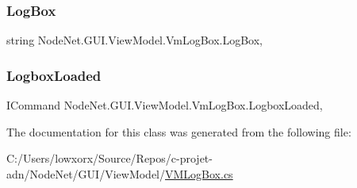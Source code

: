 \subsubsection{\texorpdfstring{Log\+Box}{LogBox}}
{\footnotesize\ttfamily string Node\+Net.\+G\+U\+I.\+View\+Model.\+Vm\+Log\+Box.\+Log\+Box\hspace{0.3cm}{\ttfamily [get]}, {\ttfamily [set]}}

\mbox{\label{class_node_net_1_1_g_u_i_1_1_view_model_1_1_vm_log_box_a0bb3ce310afc07ace0eb55680f5708ef}} 
\subsubsection{\texorpdfstring{Logbox\+Loaded}{LogboxLoaded}}
{\footnotesize\ttfamily I\+Command Node\+Net.\+G\+U\+I.\+View\+Model.\+Vm\+Log\+Box.\+Logbox\+Loaded\hspace{0.3cm}{\ttfamily [get]}, {\ttfamily [set]}}



The documentation for this class was generated from the following file\+:\begin{DoxyCompactItemize}
\item 
C\+:/\+Users/lowxorx/\+Source/\+Repos/c-\/projet-\/adn/\+Node\+Net/\+G\+U\+I/\+View\+Model/\hyperlink{_v_m_log_box_8cs}{V\+M\+Log\+Box.\+cs}\end{DoxyCompactItemize}
